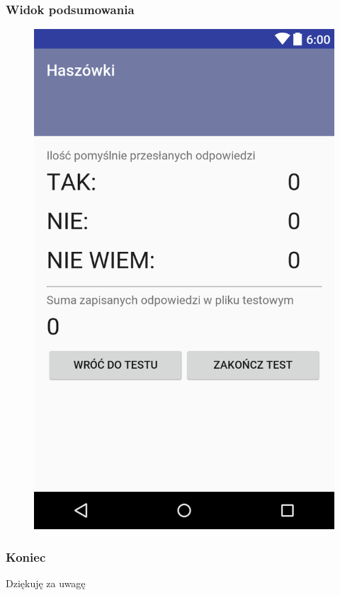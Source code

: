 \documentclass{beamer}
\begin{document}
  \begin{frame}
	\frametitle{Widok podsumowania}
	\begin{center}
		\begin{figure}[ht]
			\centering
			\includegraphics[scale=0.15]{layout-2016-11-29-223656.png}
		\end{figure}
	\end{center}
  \end{frame}

  \begin{frame}
  	\frametitle{Koniec}
    \begin{center}
    \Huge Dziękuję za uwagę
    \end{center}
  \end{frame}
\end{document}
